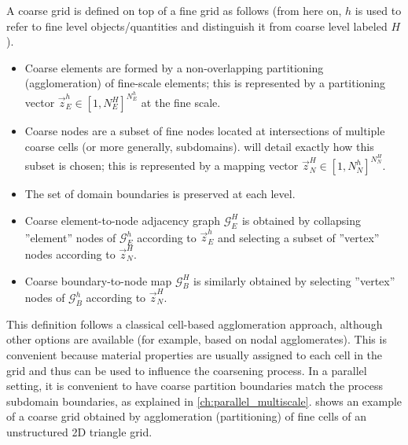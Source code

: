 A coarse grid is defined on top of a fine grid as follows (from here on, $h$ is used to refer to fine level objects/quantities and distinguish it from coarse level labeled $H$).
\begin{itemize}
    \item Coarse elements are formed by a non-overlapping partitioning (agglomeration) of fine-scale elements; this is represented by a partitioning vector $\vec{z}_E^h \in [1,N_E^H]^{N_E^h}$ at the fine scale.
    \item Coarse nodes are a subset of fine nodes located at intersections of multiple coarse cells (or more generally, subdomains).  will detail exactly how this subset is chosen; this is represented by a mapping vector $\vec{z}_N^H \in [1,N_N^h]^{N_N^H}$.
    \item The set of domain boundaries is preserved at each level.
    \item Coarse element-to-node adjacency graph $\mathcal{G}_E^H$ is obtained by collapsing ''element'' nodes of $\mathcal{G}_E^h$ according to $\vec{z}_E^h$ and selecting a subset of ''vertex'' nodes according to $\vec{z}_N^H$.
    \item Coarse boundary-to-node map $\mathcal{G}_B^H$ is similarly obtained by selecting ''vertex'' nodes of $\mathcal{G}_B^h$ according to $\vec{z}_N^H$.
\end{itemize}
This definition follows a classical cell-based agglomeration approach, although other options are available (for example, based on nodal agglomerates).   This is convenient because material properties are usually assigned to each cell in the grid and thus can be used to influence the coarsening process.   In a parallel setting, it is convenient to have coarse partition boundaries match the process subdomain boundaries, as explained in \cref{ch:parallel_multiscale}.    shows an example of a coarse grid obtained by agglomeration (partitioning) of fine cells of an unstructured 2D triangle grid.

